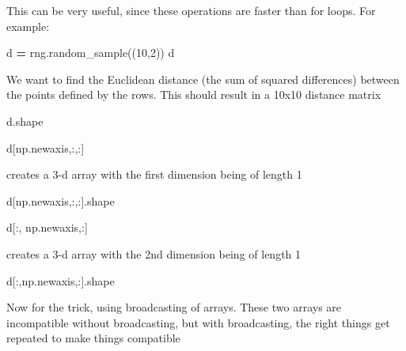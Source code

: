 \documentclass[
  letterpaper,
]{scrbook}
\newenvironment{Shaded}{\begin{snugshade}}{\end{snugshade}}
\newcommand{\DecValTok}[1]{\textcolor[rgb]{0.00,0.00,0.81}{#1}}
\newcommand{\NormalTok}[1]{#1}
\newcommand{\OperatorTok}[1]{\textcolor[rgb]{0.81,0.36,0.00}{\textbf{#1}}}
\begin{document}
This can be very useful, since these operations are faster than for loops. For example:

\begin{Shaded}
\begin{Highlighting}[]
\NormalTok{d }\OperatorTok{=}\NormalTok{ rng.random\_sample((}\DecValTok{10}\NormalTok{,}\DecValTok{2}\NormalTok{))}
\NormalTok{d}
\end{Highlighting}
\end{Shaded}

We want to find the Euclidean distance (the sum of squared differences) between the points defined by the rows. This should result in a 10x10 distance matrix

\begin{Shaded}
\begin{Highlighting}[]
\NormalTok{d.shape}
\end{Highlighting}
\end{Shaded}

\begin{Shaded}
\begin{Highlighting}[]
\NormalTok{d[np.newaxis,:,:]}
\end{Highlighting}
\end{Shaded}

creates a 3-d array with the first dimension being of length 1

\begin{Shaded}
\begin{Highlighting}[]
\NormalTok{d[np.newaxis,:,:].shape}
\end{Highlighting}
\end{Shaded}

\begin{Shaded}
\begin{Highlighting}[]
\NormalTok{d[:, np.newaxis,:]}
\end{Highlighting}
\end{Shaded}

creates a 3-d array with the 2nd dimension being of length 1

\begin{Shaded}
\begin{Highlighting}[]
\NormalTok{d[:,np.newaxis,:].shape}
\end{Highlighting}
\end{Shaded}

Now for the trick, using broadcasting of arrays. These two arrays are incompatible without broadcasting, but with broadcasting, the right things get repeated to make things compatible
\end{document}
